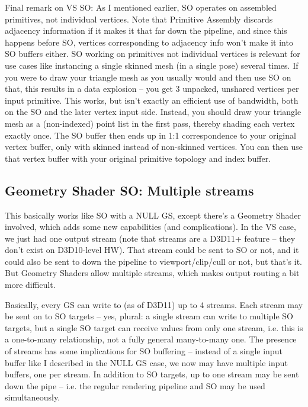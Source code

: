 \documentclass[12pt]{article}
\begin{document}
Final remark on VS SO: As I mentioned earlier, SO operates on assembled primitives, not individual vertices. Note that Primitive Assembly discards adjacency information if it makes it that far down the pipeline, and since this happens before SO, vertices corresponding to adjacency info won’t make it into SO buffers either. SO working on primitives not individual vertices is relevant for use cases like instancing a single skinned mesh (in a single pose) several times. If you were to draw your triangle mesh as you usually would and then use SO on that, this results in a data explosion – you get 3 unpacked, unshared vertices per input primitive. This works, but isn’t exactly an efficient use of bandwidth, both on the SO and the later vertex input side. Instead, you should draw your triangle mesh as a (non-indexed) point list in the first pass, thereby shading each vertex exactly once. The SO buffer then ends up in 1:1 correspondence to your original vertex buffer, only with skinned instead of non-skinned vertices. You can then use that vertex buffer with your original primitive topology and index buffer.

\subsection{Geometry Shader SO: Multiple streams}
\label{sec:orgea0d1dc}

This basically works like SO with a NULL GS, except there’s a Geometry Shader involved, which adds some new capabilities (and complications). In the VS case, we just had one output stream (note that streams are a D3D11+ feature – they don’t exist on D3D10-level HW). That stream could be sent to SO or not, and it could also be sent to down the pipeline to viewport/clip/cull or not, but that’s it. But Geometry Shaders allow multiple streams, which makes output routing a bit more difficult.

Basically, every GS can write to (as of D3D11) up to 4 streams. Each stream may be sent on to SO targets – yes, plural: a single stream can write to multiple SO targets, but a single SO target can receive values from only one stream, i.e. this is a one-to-many relationship, not a fully general many-to-many one. The presence of streams has some implications for SO buffering – instead of a single input buffer like I described in the NULL GS case, we now may have multiple input buffers, one per stream. In addition to SO targets, up to one stream may be sent down the pipe – i.e. the regular rendering pipeline and SO may be used simultaneously.
\end{document}
